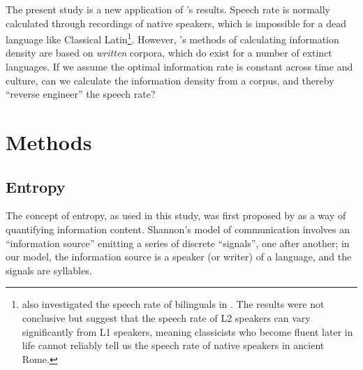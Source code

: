 \documentclass[12pt,twoside]{article}
\begin{document}
The present study is a new application of \citeauthor{coupé}'s results. Speech rate is normally calculated through recordings of native speakers, which is impossible for a dead language like Classical Latin\footnote{\citeauthor{oh} also investigated the speech rate of bilinguals in \cite{ohbilingual}. The results were not conclusive but suggest that the speech rate of L2 speakers can vary significantly from L1 speakers, meaning classicists who become fluent later in life cannot reliably tell us the speech rate of native speakers in ancient Rome.}. However, \citeauthor{oh}'s methods of calculating information density are based on \emph{written} corpora, which do exist for a number of extinct languages. If we assume the optimal information rate is constant across time and culture, can we calculate the information density from a corpus, and thereby ``reverse engineer'' the speech rate?




\section{Methods}
\label{sec:meth}

\subsection{Entropy}
\label{subsec:entropy}

The concept of entropy, as used in this study, was first proposed by \citet{shannon} as a way of quantifying information content. Shannon's model of communication involves an ``information source'' emitting a series of discrete ``signals'', one after another; in our model, the information source is a speaker (or writer) of a language, and the signals are syllables.
\end{document}
